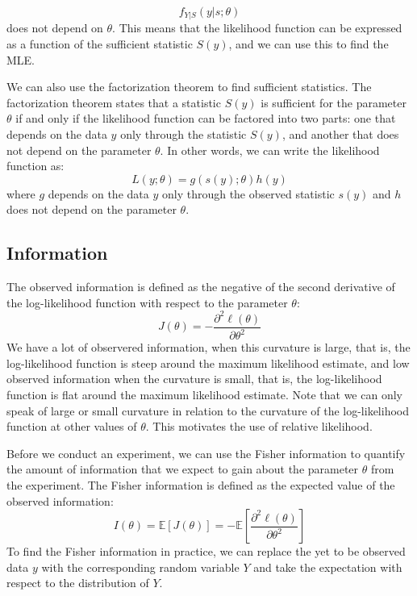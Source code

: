 \documentclass{article}
\theoremstyle{definition}
\theoremstyle{remark}
\begin{document}
\begin{equation}
    f_{Y|S}(y|s; \theta) 
\end{equation}
does not depend on $\theta$. This means that the likelihood function can be expressed as a function of the sufficient statistic $S(y)$, and we can use this to find the MLE.

We can also use the factorization theorem to find sufficient statistics. The factorization theorem states that a statistic $S(y)$ is sufficient for the parameter $\theta$ if and only if the likelihood function can be factored into two parts: one that depends on the data $y$ only through the statistic $S(y)$, and another that does not depend on the parameter $\theta$. In other words, we can write the likelihood function as:
\begin{equation}
L(y; \theta) = g(s(y); \theta) h(y)
\end{equation}
where $g$ depends on the data $y$ only through the observed statistic $s(y)$ and $h$ does not depend on the parameter $\theta$.

\subsection{Information}
The observed information is defined as the negative of the second derivative of the log-likelihood function with respect to the parameter $\theta$:
\begin{equation}
    J(\theta) = -\dfrac{\partial^2 \ell(\theta)}{\partial \theta^2}
\end{equation}
We have a lot of observered information, when this curvature is large, that is, the log-likelihood function is steep around the maximum likelihood estimate, and low observed information when the curvature is small, that is, the log-likelihood function is flat around the maximum likelihood estimate. Note that we can only speak of large or small curvature in relation to the curvature of the log-likelihood function at other values of $\theta$. This motivates the use of relative likelihood. \vspace{0.5cm}

Before we conduct an experiment, we can use the Fisher information to quantify the amount of information that we expect to gain about the parameter $\theta$ from the experiment. The Fisher information is defined as the expected value of the observed information:
\begin{equation}
    I(\theta) = \mathbb{E}[J(\theta)] = -\mathbb{E}\left[\dfrac{\partial^2 \ell(\theta)}{\partial \theta^2}\right]  
\end{equation}
To find the Fisher information in practice, we can replace the yet to be observed data $y$ with the corresponding random variable $Y$ and take the expectation with respect to the distribution of $Y$. 
\end{document}
